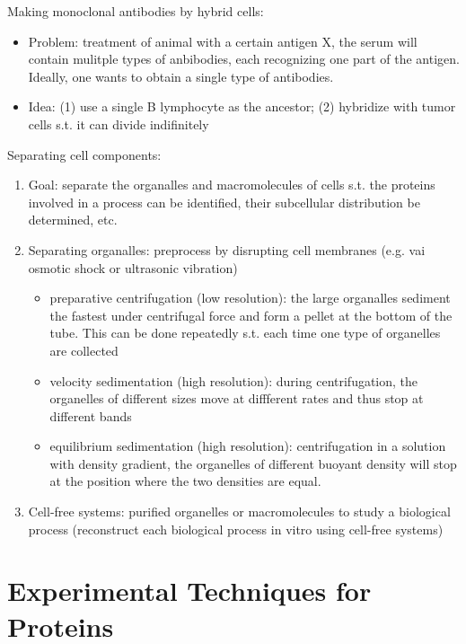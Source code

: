 \documentclass{report}
\begin{document}
Making monoclonal antibodies by hybrid cells: 
\begin{itemize}
	\item Problem: treatment of animal with a certain antigen X, the serum will contain mulitple types of anbibodies, each recognizing one part of the antigen. Ideally, one wants to obtain a single type of antibodies. 
	\item Idea: (1) use a single B lymphocyte as the ancestor; (2) hybridize with tumor cells s.t. it can divide indifinitely
\end{itemize}
 
Separating cell components: 
\begin{enumerate}

\item Goal: separate the organalles and macromolecules of cells s.t. the proteins involved in a process can be identified, their subcellular distribution be determined, etc. 

\item Separating organalles:  preprocess by disrupting cell membranes (e.g. vai osmotic shock or ultrasonic vibration)
\begin{itemize}
	\item preparative centrifugation (low resolution): the large organalles sediment the fastest under centrifugal force and form a pellet at the bottom of the tube. This can be done repeatedly s.t. each time one type of organelles are collected
	\item velocity sedimentation (high resolution): during centrifugation, the organelles of different sizes move at diffferent rates and thus stop at different bands
	\item equilibrium sedimentation (high resolution): centrifugation in a solution with density gradient, the organelles of different buoyant density will stop at the position where the two densities are equal.
\end{itemize}
 
\item Cell-free systems: purified organelles or macromolecules to study a biological process (reconstruct each biological process in vitro using cell-free systems)
\end{enumerate}
\section{Experimental Techniques for Proteins} 
\end{document}
